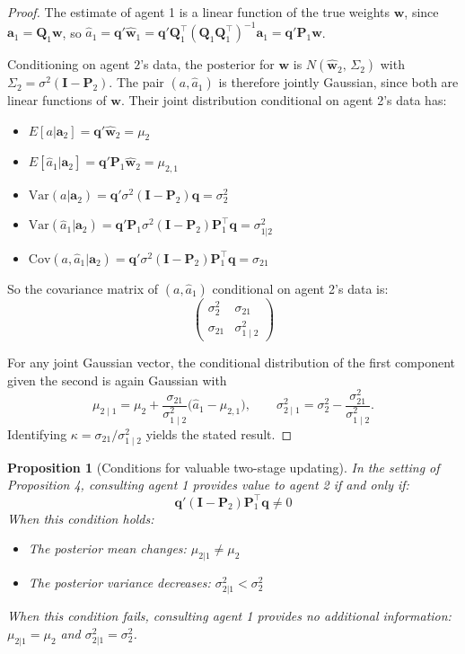 \documentclass[\ifdraft draft\fi]{article}
\newtheorem{proposition}{Proposition}
\begin{document}
\begin{greyproof}
\begin{proof}
The estimate of agent 1 is a linear function of the true weights $\bm{w}$, since $\bm{a}_1 = \bm{Q}_1\bm{w}$, so $\hat{a}_1 = \bm{q}'\hat{\bm w}_1 = \bm{q}'\bm{Q}_1^{\top}(\bm{Q}_1\bm{Q}_1^{\top})^{-1}\bm{a}_1 = \bm{q}'\bm{P}_1\bm{w}$.

Conditioning on agent $2$'s data, the posterior for $\bm{w}$ is $N(\hat{\bm w}_2,\,\Sigma_2)$ with $\Sigma_2 = \sigma^{2}(\bm{I}-\bm{P}_2)$. The pair $(a,\hat{a}_1)$ is therefore jointly Gaussian, since both are linear functions of $\bm{w}$. Their joint distribution conditional on agent 2's data has:

\begin{itemize}
    \item $E[a | \bm{a}_2] = \bm{q}'\hat{\bm{w}}_2 = \mu_2$
    \item $E[\hat{a}_1 | \bm{a}_2] = \bm{q}'\bm{P}_1\hat{\bm{w}}_2 = \mu_{2,1}$
    \item $\text{Var}(a | \bm{a}_2) = \bm{q}'\sigma^2(\bm{I} - \bm{P}_2)\bm{q} = \sigma_2^2$
    \item $\text{Var}(\hat{a}_1 | \bm{a}_2) = \bm{q}'\bm{P}_1\sigma^2(\bm{I} - \bm{P}_2)\bm{P}_1^{\top}\bm{q} = \sigma_{1|2}^2$
    \item $\text{Cov}(a, \hat{a}_1 | \bm{a}_2) = \bm{q}'\sigma^2(\bm{I} - \bm{P}_2)\bm{P}_1^{\top}\bm{q} = \sigma_{21}$
\end{itemize}

So the covariance matrix of $(a, \hat{a}_1)$ conditional on agent 2's data is:
$$\begin{pmatrix}
  \sigma_2^{2} & \sigma_{21} \\
  \sigma_{21} & \sigma_{1\mid2}^{2}
\end{pmatrix}$$

For any joint Gaussian vector, the conditional distribution of the first component given the second is again Gaussian with
\[
\mu_{2\mid1}=\mu_{2}+\frac{\sigma_{21}}{\sigma_{1\mid2}^{2}}\bigl(\hat{a}_1-\mu_{2,1}\bigr), \qquad
\sigma_{2\mid1}^{2}=\sigma_{2}^{2}-\frac{\sigma_{21}^{2}}{\sigma_{1\mid2}^{2}}.
\]
Identifying $\kappa=\sigma_{21}/\sigma_{1\mid2}^{2}$ yields the stated result.
\end{proof}
\end{greyproof}

\begin{proposition}[Conditions for valuable two-stage updating]
In the setting of Proposition 4, consulting agent 1 provides value to agent 2 if and only if:
\[\bm{q}'(\bm{I} - \bm{P}_2)\bm{P}_1^{\top}\bm{q} \neq 0\]
When this condition holds:
\begin{itemize}
    \item The posterior mean changes: $\mu_{2|1} \neq \mu_2$
    \item The posterior variance decreases: $\sigma_{2|1}^2 < \sigma_2^2$
\end{itemize}
When this condition fails, consulting agent 1 provides no additional information: $\mu_{2|1} = \mu_2$ and $\sigma_{2|1}^2 = \sigma_2^2$.
\end{proposition}
\end{document}
